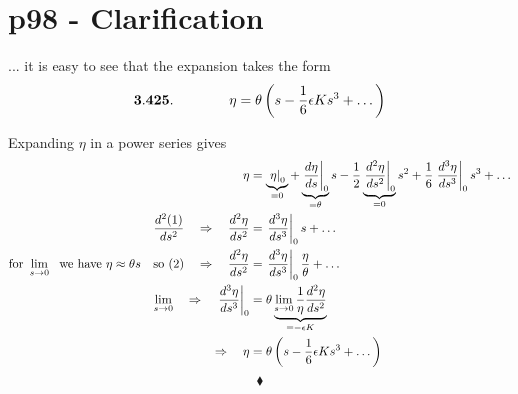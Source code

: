 \begin{comment}
	\qquad
    \subfloat[]{}
\caption{Relationship between parallel transportation along a closed path and the excess of the angle-sum over four right angles of a quadrilateral.}
\label{fig:fig_p96_3415_d}
\end{figure}\\
\\ Let's look at the point $p_2$ on $\partial \Omega$. We have $\nu_2 = \epsilon^{-}+\Psi_{1 \rightarrow 2} +\epsilon^{+}= \Psi_{1 \rightarrow 2}+\epsilon$. In general,
\begin{align}
\sum_{i=1}^{4} \nu_i &= 2\pi \\
\underbrace{\sum_{i=1}^{4} \Psi_{i \rightarrow i+1}}_{= - \delta \theta} +\sum_{i=1}^{4} \epsilon_{i} &= \sum_{i=1}^{4} \frac{\pi}{2} \\
\Rightarrow \quad - \delta \theta &= \sum_{i=1}^{4}(\frac{\pi}{2} - \epsilon _{i})
\end{align}
Calling $\frac{\pi}{2} - \epsilon _{i}$ the excess, we get the assertion made.

$$\blacklozenge$$
\newpage
\end{comment}
\section{p98 - Clarification}
\begin{tcolorbox}
... it is easy to see that the expansion takes the form $$\mathbf{3.425.}\quad\quad\quad\quad  \eta=\theta\left(s-\frac{1}{6}\epsilon K s^3 + \dots\right)$$
\end{tcolorbox}
Expanding $\eta$ in a power series gives
\begin{align}
\eta &= \underbrace{\left.\eta\right|_0}_{=0} + \underbrace{\left.\dv{\eta}{s}\right|_0 }_{=\theta}s -\frac{1}{2}\underbrace{\left.\dv[2]{\eta}{s}\right|_0}_{=0}s^2 + \frac{1}{6}\left.\dv[3]{\eta}{s}\right|_0s^3 + \dots \\ 
\dv[2]{(1)}{s} \quad \Rightarrow\quad \dv[2]{\eta}{s} &=\left.\dv[3]{\eta}{s}\right|_0s+ \dots\\
\text{for } \lim_{ s \to 0} \ \text{ we have } \eta \approx \theta s \quad \text{so (2)} \quad \Rightarrow\quad \dv[2]{\eta}{s} &=\left.\dv[3]{\eta}{s}\right|_0\frac{\eta}{\theta}+ \dots\\
\lim_{ s \to 0}\quad \Rightarrow \quad \left.\dv[3]{\eta}{s}\right|_0 &= \theta\underbrace{\lim_{ s \to 0}\frac{1}{\eta}\dv[2]{\eta}{s}}_{= -\epsilon K}\\
\Rightarrow \quad \eta&=\theta\left(s-\frac{1}{6}\epsilon K s^3 + \dots\right)
\end{align}
$$\blacklozenge$$
\newpage

